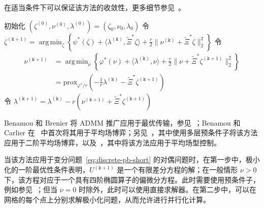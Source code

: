 \documentclass{amsproc}
\theoremstyle{definition}
\theoremstyle{remark}
\numberwithin{equation}{section}
\DeclareMathOperator*{\argmin}{arg\,min}
\newcommand{\prox}{\mathrm{prox}}
\begin{document}
在适当条件下可以保证该方法的收敛性，更多细节参见~\cite[Theorem 8]{MR1168183}。

\begin{algorithm}[H]
\DontPrintSemicolon
  
  初始化 $(\zeta^{(0)}, \nu^{(0)}, \lambda^{(0)}) = (\zeta_0, \nu_0, \lambda_0)$ \;
        { 
        令 $\zeta^{(\mathtt{k}+1)} = \argmin_{\zeta}\left\{ \psi^*(\zeta) + \langle \lambda^{(\mathtt{k})} , \widetilde{\Xi}^* \zeta \rangle  + \frac{r}{2} \|\nu^{(\mathtt{k})} + \widetilde{\Xi}^* \zeta \|_2^2 \right\}$\;
        令 
        \begin{align*}
        \nu^{(\mathtt{k}+1)} 
        &= \argmin_{\nu} \left\{ \varphi^*(\nu)  + \langle \lambda^{(\mathtt{k})} , \nu  \rangle  + \frac{r}{2} \|\nu + \widetilde{\Xi}^* \zeta^{(\mathtt{k}+1)} \|_2^2 \right\} 
        \\
        &= \prox_{\varphi^*/r}\left( - \frac{1}{r}\lambda^{(\mathtt{k})} - \widetilde{\Xi}^* \zeta^{(\mathtt{k}+1)} \right)
	\end{align*} \;
	令 $\lambda^{(\mathtt{k}+1)} = \lambda^{(\mathtt{k})} - r (\nu^{(\mathtt{k}+1)} +\widetilde{\Xi}^* \zeta^{(\mathtt{k}+1)} )$\;
	}
\caption{交替方向乘子法  \label{AMS-num-admm-algo-generic}}
\end{algorithm}



Benamou 和 Brenier 将 ADMM 推广应用于最优传输，参见~\cite{MR1738163}；Benamou 和 Carlier 在~\cite{MR3395203} 中首次将其用于平均场博弈；另见~\cite{MR3731033}，其中使用多层预条件子将该方法应用于二阶平均场博弈，以及~\cite{MR3575615}，其中将该方法应用于平均场型控制。

当该方法应用于变分问题~\eqref{eq:discrete-pb-short} 的对偶问题时，在第一步中，极小化的一阶最优性条件表明，$U^{(\mathtt{k}+1)}$ 是一个有限差分方程的解；在一般情形 $\nu>0$ 下，该方程对应于一个具有四阶椭圆算子的偏微分方程。此时需要使用预条件子，例如参见~\cite{MR2928376,BricenoAriasetalCEMRACS2017}；但当 $\nu=0$ 时除外，此时可以使用直接求解器。在第二步中，可以在网格的每个点上分别求解极小化问题，从而允许进行并行化计算。
\end{document}
